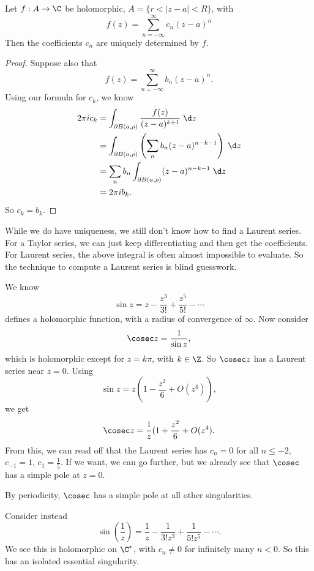 \documentclass[a4paper]{article}
\begin{document}
\begin{lemma}
  Let $f: A \to \C$ be holomorphic, $A = \{r < |z - a| < R\}$, with
  \[
    f(z) = \sum_{n = -\infty}^{\infty} c_n(z - a)^n
  \]
  Then the coefficients $c_n$ are uniquely determined by $f$.
\end{lemma}

\begin{proof}
  Suppose also that
  \[
    f(z) = \sum_{n = -\infty}^\infty b_n (z - a)^n.
  \]
  Using our formula for $c_k$, we know
  \begin{align*}
    2\pi i c_k &= \int_{\partial B(a, \rho)} \frac{f(z)}{(z - a)^{k + 1}} \;\d z \\
    &= \int_{\partial B(a, \rho)} \left(\sum_n b_n (z - a)^{n - k - 1}\right)\;\d z\\
    &= \sum_n b_n \int_{\partial B(a, \rho)} (z - a)^{n - k - 1}\;\d z\\
    &= 2\pi i b_k.
  \end{align*}
  So $c_k = b_k$.
\end{proof}
While we do have uniqueness, we still don't know how to find a Laurent series. For a Taylor series, we can just keep differentiating and then get the coefficients. For Laurent series, the above integral is often almost impossible to evaluate. So the technique to compute a Laurent series is blind guesswork.

\begin{eg}
  We know
  \[
    \sin z = z - \frac{z^3}{3!} + \frac{z^5}{5!} - \cdots
  \]
  defines a holomorphic function, with a radius of convergence of $\infty$. Now consider
  \[
    \cosec z = \frac{1}{\sin z},
  \]
  which is holomorphic except for $z = k\pi$, with $k \in \Z$. So $\cosec z$ has a Laurent series near $z = 0$. Using
  \[
    \sin z = z\left(1 - \frac{z^2}{6} + O(z^4)\right),
  \]
  we get
  \[
    \cosec z = \frac{1}{z} (1 + \frac{z^2}{6} + O(z^4).
  \]
  From this, we can read off that the Laurent series has $c_n = 0$ for all $n \leq -2$, $c_{-1} = 1$, $c_1 = \frac{1}{5}$. If we want, we can go further, but we already see that $\cosec$ has a simple pole at $z = 0$.

  By periodicity, $\cosec$ has a simple pole at all other singularities.
\end{eg}

\begin{eg}
  Consider instead
  \[
    \sin \left(\frac{1}{z}\right) = \frac{1}{z} - \frac{1}{3! z^3} + \frac{1}{5! z^5} - \cdots.
  \]
  We see this is holomorphic on $\C^*$, with $c_n \not= 0$ for infinitely many $n < 0$. So this has an isolated essential singularity.
\end{eg}
\end{document}

